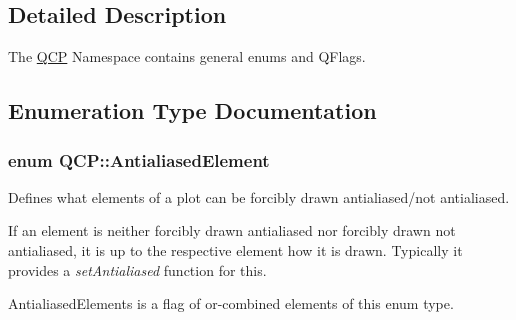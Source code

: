 \subsection{Detailed Description}
The \hyperlink{a00143}{Q\+C\+P} Namespace contains general enums and Q\+Flags. 

\subsection{Enumeration Type Documentation}
\hypertarget{a00143_ae55dbe315d41fe80f29ba88100843a0c}{
\subsubsection[{Antialiased\+Element}]{\setlength{\rightskip}{0pt plus 5cm}enum {\bf Q\+C\+P\+::\+Antialiased\+Element}}}\label{a00143_ae55dbe315d41fe80f29ba88100843a0c}


Defines what elements of a plot can be forcibly drawn antialiased/not antialiased. 

If an element is neither forcibly drawn antialiased nor forcibly drawn not antialiased, it is up to the respective element how it is drawn. Typically it provides a {\itshape set\+Antialiased} function for this.

{\ttfamily Antialiased\+Elements} is a flag of or-\/combined elements of this enum type.

